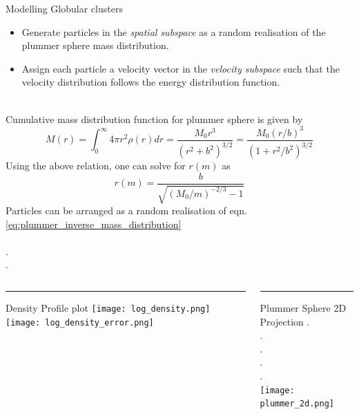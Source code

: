 \documentclass[final]{beamer}
\newlength{\colwidth}
\begin{document}
\begin{frame}[t]
\begin{columns}[t]
\begin{column}{\colwidth}
\begin{block}{Modelling Globular clusters}
\begin{itemize}
    \item Generate particles in the \textit{spatial subspace} as a random realisation of the plummer sphere mass distribution.
    \item Assign each particle a velocity vector in the \textit{velocity subspace} such that the velocity distribution follows the energy distribution function.
\end{itemize}
 \\
Cumulative mass distribution function for plummer sphere is given by 
\begin{equation}\label{eq:plummer_mass_distribution}
    M(r) = \displaystyle{\int_0^{\infty} 4\pi r^2 \rho(r) dr  }  = \displaystyle{\frac{M_0r^3}{(r^2 + b^2)^{3/2}}} = \displaystyle{\frac{M_0 (r/b)^3}{(1 + r^2/b^2)^{3/2}}}
\end{equation}
Using the above relation, one can solve for $r(m)$ as
\begin{equation}\label{eq:plummer_inverse_mass_distribution}
\boxed{r(m) = \displaystyle{\frac{b}{\sqrt{(M_0/m)^{-2/3}-1}}}}
\end{equation}
Particles can be arranged as a random realisation of eqn.\ref{eq:plummer_inverse_mass_distribution} \\ \\ 
. \\
. \\



\begin{columns}[T] %
\begin{column}{.48\textwidth}
\color{black}\rule{\linewidth}{4pt}
Density Profile plot
\texttt{[image: log\_density.png]}
\texttt{[image: log\_density\_error.png]}


\end{column}%
\hfill%
\begin{column}{.48\textwidth}
\color{black}\rule{\linewidth}{4pt}

Plummer Sphere 2D Projection 
. \\
. \\
. \\
. \\
. \\

\texttt{[image: plummer\_2d.png]}
\end{column}%
\end{columns}



\end{block}
\end{column}
\end{columns}
\end{frame}
\end{document}
